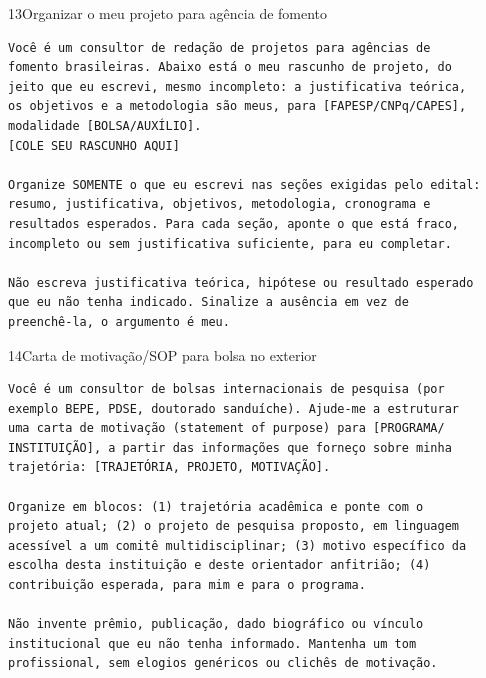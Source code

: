 \documentclass[11pt,a4paper]{article}
\begin{document}
\begin{modelo}{13}{Organizar o meu projeto para agência de fomento}
\begin{lstlisting}
Você é um consultor de redação de projetos para agências de
fomento brasileiras. Abaixo está o meu rascunho de projeto, do
jeito que eu escrevi, mesmo incompleto: a justificativa teórica,
os objetivos e a metodologia são meus, para [FAPESP/CNPq/CAPES],
modalidade [BOLSA/AUXÍLIO].
[COLE SEU RASCUNHO AQUI]

Organize SOMENTE o que eu escrevi nas seções exigidas pelo edital:
resumo, justificativa, objetivos, metodologia, cronograma e
resultados esperados. Para cada seção, aponte o que está fraco,
incompleto ou sem justificativa suficiente, para eu completar.

Não escreva justificativa teórica, hipótese ou resultado esperado
que eu não tenha indicado. Sinalize a ausência em vez de
preenchê-la, o argumento é meu.
\end{lstlisting}
\end{modelo}

\begin{modelo}{14}{Carta de motivação/SOP para bolsa no exterior}
\begin{lstlisting}
Você é um consultor de bolsas internacionais de pesquisa (por
exemplo BEPE, PDSE, doutorado sanduíche). Ajude-me a estruturar
uma carta de motivação (statement of purpose) para [PROGRAMA/
INSTITUIÇÃO], a partir das informações que forneço sobre minha
trajetória: [TRAJETÓRIA, PROJETO, MOTIVAÇÃO].

Organize em blocos: (1) trajetória acadêmica e ponte com o
projeto atual; (2) o projeto de pesquisa proposto, em linguagem
acessível a um comitê multidisciplinar; (3) motivo específico da
escolha desta instituição e deste orientador anfitrião; (4)
contribuição esperada, para mim e para o programa.

Não invente prêmio, publicação, dado biográfico ou vínculo
institucional que eu não tenha informado. Mantenha um tom
profissional, sem elogios genéricos ou clichês de motivação.
\end{lstlisting}
\end{modelo}
\end{document}
